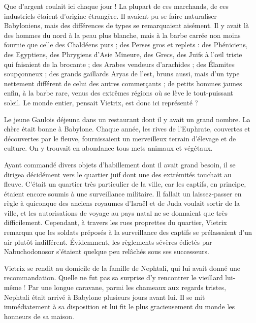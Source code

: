 \documentclass[a4paper, 11pt, oneside, polutonikogreek, french]{article}
\begin{document}
Que d'argent coulait ici chaque jour ! La plupart de ces marchands, de ces industriels étaient d'origine étrangère. Il avaient pu se faire naturaliser Babyloniens, mais des différences de types se remarquaient aisément. Il y avait là des hommes du nord à la peau plus blanche, mais à la barbe carrée non moins fournie que celle des Chaldéens purs ; des Perses gros et replets : des Phéniciens, des Egyptiens, des Phrygiens d'Asie Mineure, des Grecs, des Juifs à l'œil triste qui faisaient de la brocante ; des Arabes vendeurs d'arachides ; des Élamites soupçonneux ; des grands gaillards Aryas de l'est, bruns aussi, mais d'un type nettement différent de celui des autres commerçants ; de petits hommes jaunes enfin, à la barbe rare, venus des extrêmes régions où se lève le tout-puissant soleil. Le monde entier, pensait Vietrix, est donc ici représenté ?

\bigskip
\centerline{\EightStarTaper}
\centerline{\EightStarTaper\EightStarTaper}
\bigskip

Le jeune Gaulois déjeuna dans un restaurant dont il y avait un grand nombre. La chère était bonne à Babylone. Chaque année, les rives de l'Euphrate, couvertes et découvertes par le fleuve, fournissaient un merveilleux terrain d'élevage et de culture. On y trouvait en abondance tous mets animaux et végétaux.

\bigskip
\centerline{\EightStarTaper}
\centerline{\EightStarTaper\EightStarTaper}
\bigskip

Ayant commandé divers objets d'habillement dont il avait grand besoin, il se dirigea décidément vers le quartier juif dont une des extrémités touchait au fleuve. C'était un quartier très particulier de la ville, car les captifs, en principe, étaient encore soumis à une surveillance militaire. Il fallait un laissez-passer en règle à quiconque des anciens royaumes d'Israël et de Juda voulait sortir de la ville, et les autorisations de voyage au pays natal ne se donnaient que très difficilement. Cependant, à travers les rues proprettes du quartier, Vietrix remarqua que les soldats préposés à la surveillance des captifs se prélassaient d'un air plutôt indifférent. Évidemment, les règlements sévères édictés par Nabuchodonosor s'étaient quelque peu relâchés sous ses successeurs.

Vietrix se rendit au domicile de la famille de Nephtali, qui lui avait donné une recommandation. Quelle ne fut pas sa surprise d'y rencontrer le vieillard lui-même ! Par une longue caravane, parmi les chameaux aux regards tristes, Nephtali était arrivé à Babylone plusieurs jours avant lui. Il se mit immédiatement à sa disposition et lui fit le plus gracieusement du monde les honneurs de sa maison.
\end{document}
